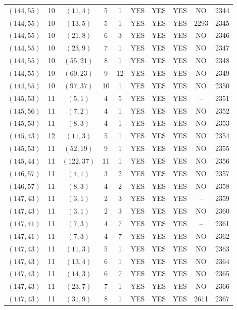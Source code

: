 \begin{longtable}{|c|c|c|c|c|c|c|c|c|c|}
$(144, 55)$ & 10 & $(11, 4)$ & 5 & 1 & YES & YES & YES & NO & 2344\\
$(144, 55)$ & 10 & $(13, 5)$ & 5 & 1 & YES & YES & YES & 2293 & 2345\\
$(144, 55)$ & 10 & $(21, 8)$ & 6 & 3 & YES & YES & YES & NO & 2346\\
$(144, 55)$ & 10 & $(23, 9)$ & 7 & 1 & YES & YES & YES & NO & 2347\\
$(144, 55)$ & 10 & $(55, 21)$ & 8 & 1 & YES & YES & YES & NO & 2348\\
$(144, 55)$ & 10 & $(60, 23)$ & 9 & 12 & YES & YES & YES & NO & 2349\\
$(144, 55)$ & 10 & $(97, 37)$ & 10 & 1 & YES & YES & YES & NO & 2350\\
$(145, 53)$ & 11 & $(5, 1)$ & 4 & 5 & YES & YES & YES & -- & 2351\\
$(145, 56)$ & 11 & $(7, 2)$ & 4 & 1 & YES & YES & YES & NO & 2352\\
$(145, 53)$ & 11 & $(8, 3)$ & 4 & 1 & YES & YES & YES & NO & 2353\\
$(145, 43)$ & 12 & $(11, 3)$ & 5 & 1 & YES & YES & YES & NO & 2354\\
$(145, 53)$ & 11 & $(52, 19)$ & 9 & 1 & YES & YES & YES & NO & 2355\\
$(145, 44)$ & 11 & $(122, 37)$ & 11 & 1 & YES & YES & YES & NO & 2356\\
$(146, 57)$ & 11 & $(4, 1)$ & 3 & 2 & YES & YES & YES & NO & 2357\\
$(146, 57)$ & 11 & $(8, 3)$ & 4 & 2 & YES & YES & YES & NO & 2358\\
$(147, 43)$ & 11 & $(3, 1)$ & 2 & 3 & YES & YES & YES & -- & 2359\\
$(147, 43)$ & 11 & $(3, 1)$ & 2 & 3 & YES & YES & YES & NO & 2360\\
$(147, 41)$ & 11 & $(7, 3)$ & 4 & 7 & YES & YES & YES & -- & 2361\\
$(147, 41)$ & 11 & $(7, 3)$ & 4 & 7 & YES & YES & YES & NO & 2362\\
$(147, 43)$ & 11 & $(11, 3)$ & 5 & 1 & YES & YES & YES & NO & 2363\\
$(147, 43)$ & 11 & $(13, 4)$ & 6 & 1 & YES & YES & YES & NO & 2364\\
$(147, 43)$ & 11 & $(14, 3)$ & 6 & 7 & YES & YES & YES & NO & 2365\\
$(147, 43)$ & 11 & $(23, 7)$ & 7 & 1 & YES & YES & YES & NO & 2366\\
$(147, 43)$ & 11 & $(31, 9)$ & 8 & 1 & YES & YES & YES & 2611 & 2367\\

\end{longtable}
